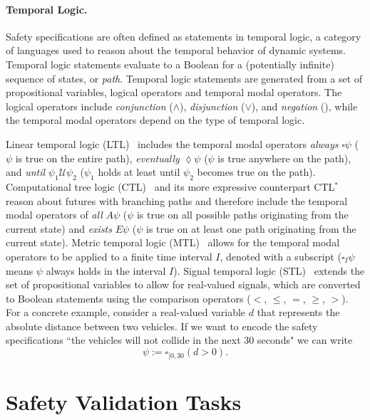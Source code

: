 \paragraph{Temporal Logic.} Safety specifications are often defined as statements in temporal logic, a category of languages used to reason about the temporal behavior of dynamic systems. Temporal logic statements evaluate to a Boolean for a (potentially infinite) sequence of states, or \emph{path}. Temporal logic statements are generated from a set of propositional variables, logical operators and temporal modal operators. The logical operators include \emph{conjunction} ($\land$), \emph{disjunction} ($\lor$), and \emph{negation} (\lnot), while the temporal modal operators depend on the type of temporal logic. 

Linear temporal logic (LTL)~\cite{pnueli1977temporal} includes the temporal modal operators \emph{always} $\square \psi$ ($\psi$ is true on the entire path), \emph{eventually} $\lozenge \psi$ ($\psi$ is true anywhere on the path), and \emph{until} $\psi_1 \mathcal{U} \psi_2$ ($\psi_1$ holds at least until $\psi_2$ becomes true on the path). Computational tree logic (CTL)~\cite{clarke1981design} and its more expressive counterpart CTL$^*$~\cite{emerson1986sometimes} reason about futures with branching paths and therefore include the temporal modal operators of \emph{all} $A \psi$ ($\psi$ is true on all possible paths originating from the current state) and \emph{exists} $E \psi$ ($\psi$ is true on at least one path originating from the current state). Metric temporal logic (MTL)~\cite{koymans1990specifying} allows for the temporal modal operators to be applied to a finite time interval $I$, denoted with a subscript ($\square_I \psi$ means $\psi$ always holds in the interval $I$). Signal temporal logic (STL)~\cite{maler2004monitoring} extends the set of propositional variables to allow for real-valued signals, which are converted to Boolean statements using the comparison operators ($<$, $\leq$, $=$, $\geq$, $>$). For a concrete example, consider a real-valued variable $d$ that represents the absolute distance between two vehicles. If we want to encode the safety specifications ``the vehicles will not collide in the next 30 seconds" we can write
\begin{equation}
    \psi := \square_{[0,30} (d > 0) \text{.}
\end{equation}



\section{Safety Validation Tasks}

